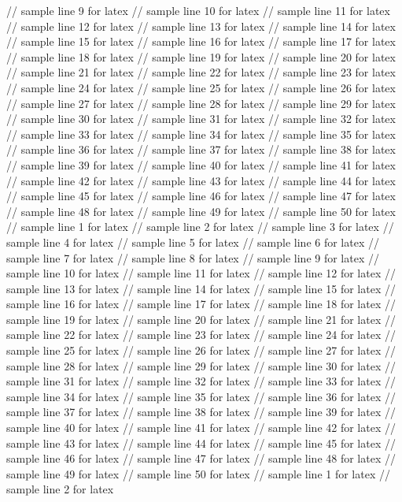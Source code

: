 // sample line 9 for latex
// sample line 10 for latex
// sample line 11 for latex
// sample line 12 for latex
// sample line 13 for latex
// sample line 14 for latex
// sample line 15 for latex
// sample line 16 for latex
// sample line 17 for latex
// sample line 18 for latex
// sample line 19 for latex
// sample line 20 for latex
// sample line 21 for latex
// sample line 22 for latex
// sample line 23 for latex
// sample line 24 for latex
// sample line 25 for latex
// sample line 26 for latex
// sample line 27 for latex
// sample line 28 for latex
// sample line 29 for latex
// sample line 30 for latex
// sample line 31 for latex
// sample line 32 for latex
// sample line 33 for latex
// sample line 34 for latex
// sample line 35 for latex
// sample line 36 for latex
// sample line 37 for latex
// sample line 38 for latex
// sample line 39 for latex
// sample line 40 for latex
// sample line 41 for latex
// sample line 42 for latex
// sample line 43 for latex
// sample line 44 for latex
// sample line 45 for latex
// sample line 46 for latex
// sample line 47 for latex
// sample line 48 for latex
// sample line 49 for latex
// sample line 50 for latex
// sample line 1 for latex
// sample line 2 for latex
// sample line 3 for latex
// sample line 4 for latex
// sample line 5 for latex
// sample line 6 for latex
// sample line 7 for latex
// sample line 8 for latex
// sample line 9 for latex
// sample line 10 for latex
// sample line 11 for latex
// sample line 12 for latex
// sample line 13 for latex
// sample line 14 for latex
// sample line 15 for latex
// sample line 16 for latex
// sample line 17 for latex
// sample line 18 for latex
// sample line 19 for latex
// sample line 20 for latex
// sample line 21 for latex
// sample line 22 for latex
// sample line 23 for latex
// sample line 24 for latex
// sample line 25 for latex
// sample line 26 for latex
// sample line 27 for latex
// sample line 28 for latex
// sample line 29 for latex
// sample line 30 for latex
// sample line 31 for latex
// sample line 32 for latex
// sample line 33 for latex
// sample line 34 for latex
// sample line 35 for latex
// sample line 36 for latex
// sample line 37 for latex
// sample line 38 for latex
// sample line 39 for latex
// sample line 40 for latex
// sample line 41 for latex
// sample line 42 for latex
// sample line 43 for latex
// sample line 44 for latex
// sample line 45 for latex
// sample line 46 for latex
// sample line 47 for latex
// sample line 48 for latex
// sample line 49 for latex
// sample line 50 for latex
// sample line 1 for latex
// sample line 2 for latex
